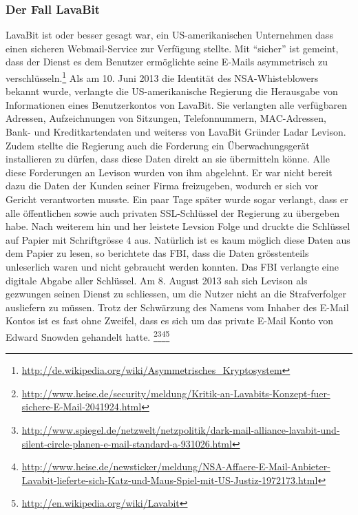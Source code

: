 \subsubsection{Der Fall LavaBit}
LavaBit ist oder besser gesagt war, ein US-amerikanischen Unternehmen dass einen sicheren Webmail-Service zur Verfügung stellte.
Mit ``sicher'' ist gemeint, dass der Dienst es dem Benutzer ermöglichte seine E-Mails asymmetrisch zu verschlüsseln.\footnote{\url{http://de.wikipedia.org/wiki/Asymmetrisches_Kryptosystem}}
Als am 10. Juni 2013 die Identität des NSA-Whisteblowers bekannt wurde, verlangte die US-amerikanische Regierung die Herausgabe von Informationen eines Benutzerkontos von LavaBit.
Sie verlangten alle verfügbaren Adressen, Aufzeichnungen von Sitzungen, Telefonnummern, MAC-Adressen, Bank- und Kreditkartendaten und weiterss von LavaBit Gründer Ladar Levison. Zudem stellte die Regierung auch die Forderung ein Überwachungsgerät installieren zu dürfen, dass diese Daten direkt an sie übermitteln könne. Alle diese Forderungen an Levison wurden von ihm abgelehnt. Er war nicht bereit dazu die Daten der Kunden seiner Firma freizugeben, wodurch er sich vor Gericht verantworten musste.
Ein paar Tage später wurde sogar verlangt, dass er alle öffentlichen sowie auch privaten SSL-Schlüssel der Regierung zu übergeben habe. Nach weiterem hin und her leistete Levsion Folge und druckte die Schlüssel auf Papier mit Schriftgrösse 4 aus. Natürlich ist es kaum möglich diese Daten aus dem Papier zu lesen, so berichtete das FBI, dass die Daten grösstenteils unleserlich waren und nicht gebraucht werden konnten. Das FBI verlangte eine digitale Abgabe aller Schlüssel.
Am 8. August 2013 sah sich Levison als gezwungen seinen Dienst zu schliessen, um die Nutzer nicht an die Strafverfolger ausliefern zu müssen.
Trotz der Schwärzung des Namens vom Inhaber des E-Mail Kontos ist es fast ohne Zweifel, dass es sich um das private E-Mail Konto von Edward Snowden gehandelt hatte.
\footnote{\url{http://www.heise.de/security/meldung/Kritik-an-Lavabits-Konzept-fuer-sichere-E-Mail-2041924.html}}\footnote{\url{http://www.spiegel.de/netzwelt/netzpolitik/dark-mail-alliance-lavabit-und-silent-circle-planen-e-mail-standard-a-931026.html}}\footnote{\url{http://www.heise.de/newsticker/meldung/NSA-Affaere-E-Mail-Anbieter-Lavabit-lieferte-sich-Katz-und-Maus-Spiel-mit-US-Justiz-1972173.html}}\footnote{\url{http://en.wikipedia.org/wiki/Lavabit}}

